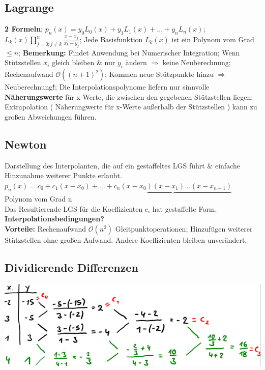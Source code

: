 \subsection{Lagrange}
\textbf{2 Formeln}; 
$ p_{n}(x) = y_{0} L_{0} (x) + y_{1} L_{1} (x)+ ... +y_{n} L_{n} (x) $;
$ L_{k}(x) \prod_{ j = 0;j\neq k }^{n} \frac{ x-x_{j} }{ x_{k} - y_{j} } $; 
Jede Basisfunktion $ L_{k}(x) $ ist ein Polynom vom Grad $ \le n $; 
\textbf{Bemerkung:} Findet Anwendung bei Numerischer Integration; Wenn Stützstellen $ x_{i}  $ gleich bleiben \& nur $ y_{i} $ ändern $ \Rightarrow $ keine Neuberechnung; Rechenaufwand $ \mathcal O ( ( n +1)^{2} ) $; Kommen neue Stützpunkte hinzu $ \Rightarrow $ Neuberechnung\textbf{!}; Die Interpolationspolynome liefern nur sinnvolle \textbf{ Näherungswerte } für x-Werte, die zwischen den gegebenen Stützstellen liegen; Extrapolation ( Näherungwerte für x-Werte außerhalb der Stützstellen ) kann zu großen Abweichungen führen.

\subsection{Newton}
Darstellung des Interpolanten, die auf ein gestaffeltes LGS führt \& einfache Hinzunahme weiterer Punkte erlaubt.
$p_{n}(x) = c_{0} + c_{1} ( x-x_{0} ) + ... + \underbrace {c_{n} ( x-x_{0} ) ( x-x_{1} ) ... ( x-x_{n-1} ) } $\\
Polynom vom Grad n\\
Das Resultierende LGS für die Koeffizienten $ c_{i} $ hat gestaffelte Form.
\textbf{Interpolationsbedingungen?}\\
\textbf{Vorteile:} Rechenaufwand $ \mathcal O ( n^{2} ) $ Gleitpunktoperationen; Hinzufügen weiterer Stützstellen ohne großen Aufwand. Andere Koeffizienten bleiben unverändert.

\subsection{Dividierende Differenzen}
\includegraphics[scale=0.25]{./pic/DividierendeDifferenzen.png}

